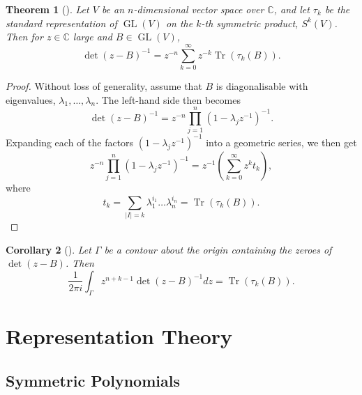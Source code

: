 \documentclass{article}
\newtheorem{theorem}{Theorem}[section]
\newtheorem{corollary}[theorem]{Corollary}
\newcommand{\CC}{\mathbb{C}}
\newcommand{\pbrackets}[1]{\left( #1 \right)}
\DeclareMathOperator{\Tr}{Tr}
\DeclareMathOperator{\GL}{GL}
\begin{document}
	\begin{theorem}[\cite{CanasdaSilva1996}]\label{residue:3}
		Let $V$ be an $n$-dimensional vector space over $\CC$, and let $\tau_{k}$ be the standard representation of $\GL(V)$ on the $k$-th symmetric product, $S^{k}(V)$. Then for $z \in \CC$ large and $B \in \GL(V)$,
		\begin{equation*}
			\det(z - B)^{-1} = z^{-n}\sum\limits_{k=0}^{\infty} z^{-k} \Tr(\tau_{k}(B)).
		\end{equation*}
	\end{theorem}

	\begin{proof}
		Without loss of generality, assume that $B$ is diagonalisable with eigenvalues, $\lambda_{1}, \ldots, \lambda_{n}$. The left-hand side then becomes
		\begin{equation*}
			\det(z - B)^{-1} = z^{-n}\prod\limits_{j = 1}^{n}(1 - \lambda_{j}z^{-1})^{-1}.
		\end{equation*}
		Expanding each of the factors $(1 - \lambda_{j}z^{-1})^{-1}$ into a geometric series, we then get
		\begin{equation*}
			z^{-n}\prod\limits_{j = 1}^{n}(1 - \lambda_{j}z^{-1})^{-1} = z^{-1}\left( \sum_{k = 0}^{\infty} z^{k}t_{k} \right),
		\end{equation*}
		where
		\begin{equation*}
			t_{k} = \sum_{|I| = k} \lambda_{1}^{i_{1}}\ldots\lambda_{n}^{i_{n}} = \Tr\pbrackets{\tau_{k}(B)}.
		\end{equation*}
	\end{proof}
	
	\begin{corollary}[\cite{CanasdaSilva1996}]\label{residue:4}
		Let $\Gamma$ be a contour about the origin containing the zeroes of $\det(z - B)$. Then
		\begin{equation*}
			\frac{1}{2\pi i} \int_{\Gamma} z^{n + k -1} \det(z - B)^{-1} dz = \Tr\pbrackets{\tau_{k}(B)}.
		\end{equation*}
	\end{corollary}

	\section{Representation Theory}
	
	\subsection{Symmetric Polynomials}
	
\end{document}

